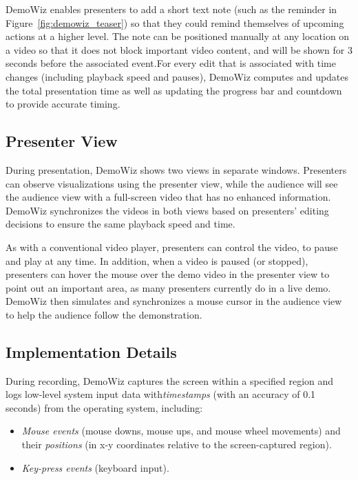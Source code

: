 DemoWiz enables presenters to add a short text note (such as the reminder  in Figure~\ref{fig:demowiz_teaser}) so that they could remind themselves of upcoming actions at a higher level. The note can be positioned manually at any location on a video so that it does not block important video content, and will be shown for 3 seconds before the associated event.For every edit that is associated with time changes (including playback speed and pauses), DemoWiz computes and updates the total presentation time as well as updating the progress bar and countdown to provide accurate timing.


\subsection{Presenter View}
During presentation, DemoWiz shows two views in separate windows. Presenters can observe visualizations using the presenter view, while the audience will see the audience view with a full-screen video that has no enhanced information. DemoWiz synchronizes the videos in both views based on presenters' editing decisions to ensure the same playback speed and time.

As with a conventional video player, presenters can control the video, to pause and play at any time. In addition, when a video is paused (or stopped), presenters can hover the mouse over the demo video in the presenter view to point out an important area, as many presenters currently do in a live demo. DemoWiz then simulates and synchronizes a mouse cursor in the audience view to help the audience follow the demonstration.


\subsection{Implementation Details}
During recording, DemoWiz captures the screen within a specified region and logs low-level system input data with\textit{timestamps} (with an accuracy of 0.1 seconds) from the operating system, including:
\clearpage

\begin{itemize}
  \item \textit{Mouse events} (mouse downs, mouse ups, and mouse wheel movements) and their \textit{positions} (in x-y coordinates relative to the screen-captured region).
  \item \textit{Key-press events} (keyboard input).
\end{itemize}

